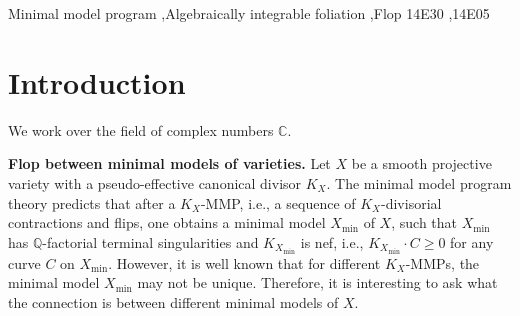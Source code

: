 \documentclass[preprint,12pt]{elsarticle}
\begin{document}
\begin{frontmatter}


\begin{keyword}
Minimal model program \sep Algebraically integrable foliation \sep Flop
\MSC 14E30 \sep 14E05
\end{keyword}

\end{frontmatter}







\section{Introduction}\label{sec: Introduction}

We work over the field of complex numbers $\mathbb C$.

\medskip


\noindent\textbf{Flop between minimal models of varieties.} Let $X$ be a smooth projective variety with a pseudo-effective canonical divisor $K_X$. The minimal model program theory predicts that after a $K_X$-MMP, i.e., a sequence of $K_X$-divisorial contractions and flips, one obtains a minimal model $X_{\min}$ of $X$, such that $X_{\min}$ has $\mathbb{Q}$-factorial terminal singularities and $K_{X_{\min}}$ is nef, i.e., $K_{X_{\min}} \cdot C \geq 0$ for any curve $C$ on $X_{\min}$. However, it is well known that for different $K_X$-MMPs, the minimal model $X_{\min}$ may not be unique. Therefore, it is interesting to ask what the connection is between different minimal models of $X$.
\end{document}
